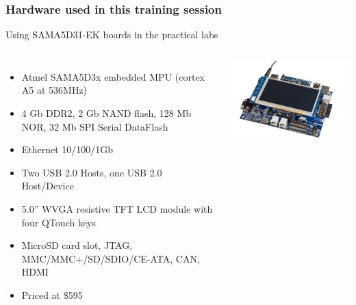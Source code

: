 \begin{frame}
\frametitle{Hardware used in this training session}
  Using SAMA5D31-EK boards in the practical labs
  \begin{columns}
    \begin{itemize}
      \item Atmel SAMA5D3x embedded MPU (cortex A5 at 536MHz)
      \item 4 Gb DDR2, 2 Gb NAND flash, 128 Mb NOR, 32 Mb SPI Serial DataFlash
      \item Ethernet 10/100/1Gb
      \item Two USB 2.0 Hosts, one USB 2.0 Host/Device
      \item 5.0” WVGA resistive TFT LCD module with four QTouch keys
      \item MicroSD card slot, JTAG, MMC/MMC+/SD/SDIO/CE-ATA, CAN, HDMI
      \item Priced at \$595
    \end{itemize}
    \includegraphics[width=\textwidth]{slides/sama5d3-board/sama5d31ek.jpg}
  \end{columns}
\end{frame}
